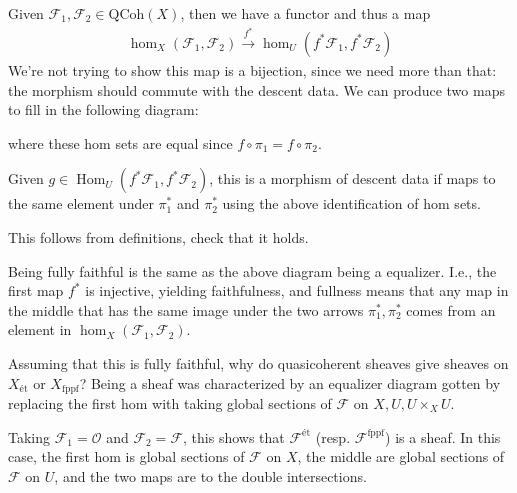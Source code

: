 Given \(\mathcal{F}_1, \mathcal{F}_2 \in {\mathrm{QCoh}}(X)\), then we
have a functor and thus a map
\begin{align*}
\hom_X(\mathcal{F}_1, \mathcal{F}_2) \xrightarrow{f^*} \hom_U(f^*\mathcal{F}_1, f^*\mathcal{F}_2)
\end{align*}
We're not trying to show this map is a bijection, since we need more
than that: the morphism should commute with the descent data. We can
produce two maps to fill in the following diagram:

where these hom sets are equal since \(f\circ \pi_1 = f\circ \pi_2\).

\begin{claim}

Given
\(g\in {\operatorname{Hom}}_U(f^* \mathcal{F}_1, f^* \mathcal{F}_2)\),
this is a morphism of descent data if maps to the same element under
\(\pi_1^*\) and \(\pi_2^*\) using the above identification of hom sets.

\end{claim}

\begin{exercise}[?]

This follows from definitions, check that it holds.

\end{exercise}

Being fully faithful is the same as the above diagram being a equalizer.
I.e., the first map \(f^*\) is injective, yielding faithfulness, and
fullness means that any map in the middle that has the same image under
the two arrows \(\pi_1^*, \pi_2^*\) comes from an element in
\(\hom_X(\mathcal{F}_1, \mathcal{F}_2)\).

Assuming that this is fully faithful, why do quasicoherent sheaves give
sheaves on \(X_{\text{ét}}\) or \(X_{\mathrm{\operatorname{fppf}}}\)?
Being a sheaf was characterized by an equalizer diagram gotten by
replacing the first hom with taking global sections of \(\mathcal{F}\)
on \(X, U, U\times_X U\).

\begin{remark}

Taking \(\mathcal{F}_1 = {\mathcal{O}}\) and
\(\mathcal{F}_2 = \mathcal{F}\), this shows that
\(\mathcal{F}^{\text{ét}}\) (resp.
\(\mathcal{F}^{\mathrm{\operatorname{fppf}}}\)) is a sheaf. In this
case, the first hom is global sections of \(\mathcal{F}\) on \(X\), the
middle are global sections of \(\mathcal{F}\) on \(U\), and the two maps
are to the double intersections.

\end{remark}


